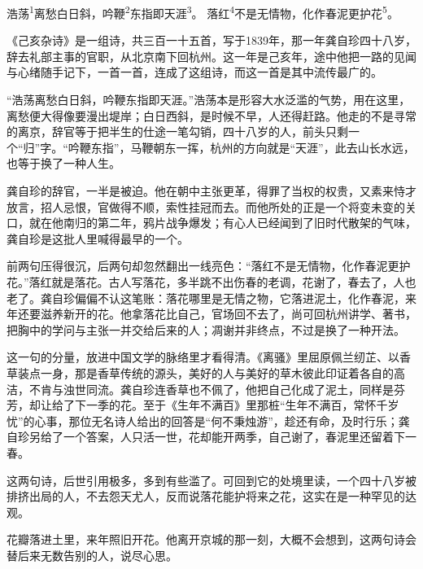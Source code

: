 
\begin{poem}
浩荡\textsuperscript{1}离愁白日斜，吟鞭\textsuperscript{2}东指即天涯\textsuperscript{3}。
落红\textsuperscript{4}不是无情物，化作春泥更护花\textsuperscript{5}。
\end{poem}

\begin{annotations}
\end{annotations}

\begin{appreciation}
《己亥杂诗》是一组诗，共三百一十五首，写于1839年，那一年龚自珍四十八岁，辞去礼部主事的官职，从北京南下回杭州。这一年是己亥年，途中他把一路的见闻与心绪随手记下，一首一首，连成了这组诗，而这一首是其中流传最广的。

“浩荡离愁白日斜，吟鞭东指即天涯。”浩荡本是形容大水泛滥的气势，用在这里，离愁便大得像要漫出堤岸；白日西斜，是时候不早，人还得赶路。他走的不是寻常的离京，辞官等于把半生的仕途一笔勾销，四十八岁的人，前头只剩一个“归”字。“吟鞭东指”，马鞭朝东一挥，杭州的方向就是“天涯”，此去山长水远，也等于换了一种人生。

龚自珍的辞官，一半是被迫。他在朝中主张更革，得罪了当权的权贵，又素来恃才放言，招人忌恨，官做得不顺，索性挂冠而去。而他所处的正是一个将变未变的关口，就在他南归的第二年，鸦片战争爆发；有心人已经闻到了旧时代散架的气味，龚自珍是这批人里喊得最早的一个。

前两句压得很沉，后两句却忽然翻出一线亮色：“落红不是无情物，化作春泥更护花。”落红就是落花。古人写落花，多半跳不出伤春的老调，花谢了，春去了，人也老了。龚自珍偏偏不认这笔账：落花哪里是无情之物，它落进泥土，化作春泥，来年还要滋养新开的花。他拿落花比自己，官场回不去了，尚可回杭州讲学、著书，把胸中的学问与主张一并交给后来的人；凋谢并非终点，不过是换了一种开法。

这一句的分量，放进中国文学的脉络里才看得清。《离骚》里屈原佩兰纫芷、以香草装点一身，那是香草传统的源头，美好的人与美好的草木彼此印证着各自的高洁，不肯与浊世同流。龚自珍连香草也不佩了，他把自己化成了泥土，同样是芬芳，却让给了下一季的花。至于《生年不满百》里那桩“生年不满百，常怀千岁忧”的心事，那位无名诗人给出的回答是“何不秉烛游”，趁还有命，及时行乐；龚自珍另给了一个答案，人只活一世，花却能开两季，自己谢了，春泥里还留着下一春。

这两句诗，后世引用极多，多到有些滥了。可回到它的处境里读，一个四十八岁被排挤出局的人，不去怨天尤人，反而说落花能护将来之花，这实在是一种罕见的达观。

花瓣落进土里，来年照旧开花。他离开京城的那一刻，大概不会想到，这两句诗会替后来无数告别的人，说尽心思。
\end{appreciation}

